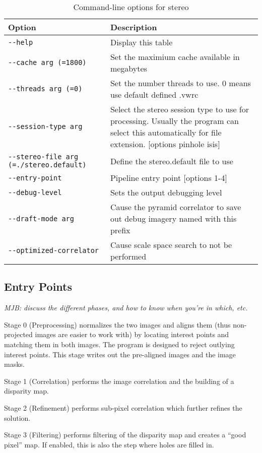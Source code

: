 \begin{longtable}{|l|p{10cm}|}
\caption{Command-line options for stereo}
\label{tbl:stereo}
\endfirsthead
\endhead
\endfoot
\endlastfoot
\hline
Option & Description \\ \hline \hline
\verb#--help# & Display this table\\ \hline
\verb#--cache arg (=1800)# & Set the maximium cache available in megabytes\\ \hline
\verb#--threads arg (=0)# & Set the number threads to use. 0 means use default defined .vwrc\\ \hline
\verb#--session-type arg# & Select the stereo session type to use for processing. Usually the program can select this automatically for file extension. [options pinhole isis]\\ \hline
\verb#--stereo-file arg (=./stereo.default)# & Define the stereo.default file to use\\ \hline
\verb#--entry-point# & Pipeline entry point [options 1-4]\\ \hline
\verb#--debug-level# & Sets the output debugging level\\ \hline
\verb#--draft-mode arg# & Cause the pyramid correlator to save out debug imagery named with this prefix\\ \hline
\verb#--optimized-correlator# & Cause scale space search to not be performed\\ \hline
\end{longtable}

\subsection{Entry Points}
\label{entrypoints}

\emph{MJB: discuss the different phases, and how to know when you're
in which, etc.}

Stage 0 (Preprocessing) normalizes the two images and aligns them
(thus non-projected images are easier to work with) by locating
interest points and matching them in both images. The program is
designed to reject outlying interest points.  This stage writes out
the pre-aligned images and the image masks.

Stage 1 (Correlation) performs the image correlation and the building
of a disparity map.

Stage 2 (Refinement) performs sub-pixel correlation which further
refines the solution.

Stage 3 (Filtering) performs filtering of the disparity map and
creates a ``good pixel'' map.  If enabled, this is also the step
where holes are filled in.

